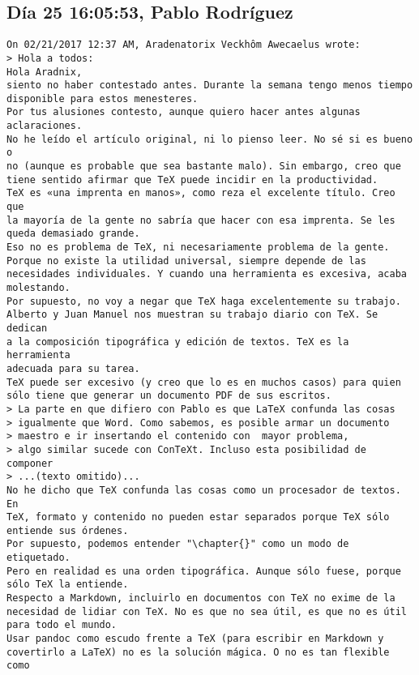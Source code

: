 \documentclass[a4paper,10pt]{article}
\begin{document}
\subsection{Día 25 16:05:53, Pablo Rodríguez}

\begin{lstlisting}
On 02/21/2017 12:37 AM, Aradenatorix Veckhôm Awecaelus wrote:
> Hola a todos:
Hola Aradnix,
siento no haber contestado antes. Durante la semana tengo menos tiempo
disponible para estos menesteres.
Por tus alusiones contesto, aunque quiero hacer antes algunas aclaraciones.
No he leído el artículo original, ni lo pienso leer. No sé si es bueno o
no (aunque es probable que sea bastante malo). Sin embargo, creo que
tiene sentido afirmar que TeX puede incidir en la productividad.
TeX es «una imprenta en manos», como reza el excelente título. Creo que
la mayoría de la gente no sabría que hacer con esa imprenta. Se les
queda demasiado grande.
Eso no es problema de TeX, ni necesariamente problema de la gente.
Porque no existe la utilidad universal, siempre depende de las
necesidades individuales. Y cuando una herramienta es excesiva, acaba
molestando.
Por supuesto, no voy a negar que TeX haga excelentemente su trabajo.
Alberto y Juan Manuel nos muestran su trabajo diario con TeX. Se dedican
a la composición tipográfica y edición de textos. TeX es la herramienta
adecuada para su tarea.
TeX puede ser excesivo (y creo que lo es en muchos casos) para quien
sólo tiene que generar un documento PDF de sus escritos.
> La parte en que difiero con Pablo es que LaTeX confunda las cosas
> igualmente que Word. Como sabemos, es posible armar un documento
> maestro e ir insertando el contenido con  mayor problema,
> algo similar sucede con ConTeXt. Incluso esta posibilidad de componer
> ...(texto omitido)...
No he dicho que TeX confunda las cosas como un procesador de textos. En
TeX, formato y contenido no pueden estar separados porque TeX sólo
entiende sus órdenes.
Por supuesto, podemos entender "\chapter{}" como un modo de etiquetado.
Pero en realidad es una orden tipográfica. Aunque sólo fuese, porque
sólo TeX la entiende.
Respecto a Markdown, incluirlo en documentos con TeX no exime de la
necesidad de lidiar con TeX. No es que no sea útil, es que no es útil
para todo el mundo.
Usar pandoc como escudo frente a TeX (para escribir en Markdown y
covertirlo a LaTeX) no es la solución mágica. O no es tan flexible como

\end{lstlisting}
\end{document}
